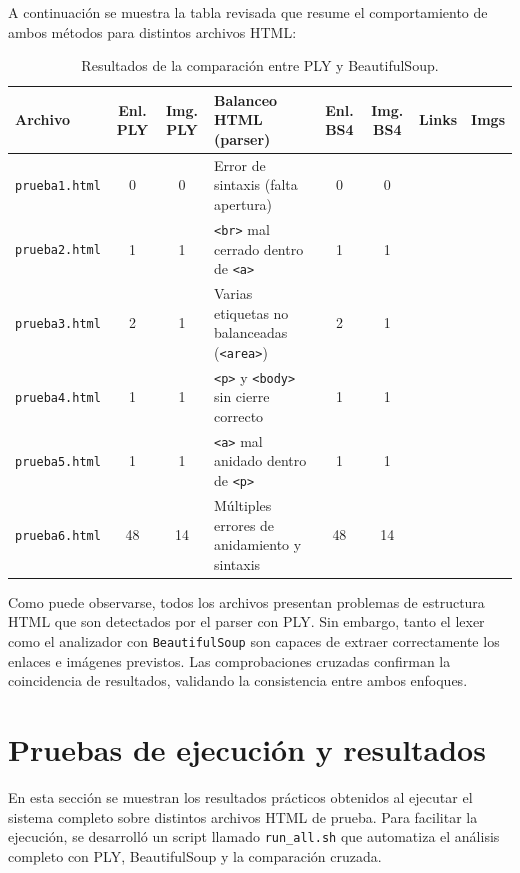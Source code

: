 \documentclass[11pt,a4paper]{article}
\newcommand{\cmark}{\ding{51}}
\begin{document}
A continuación se muestra la tabla revisada que resume el comportamiento de ambos métodos para distintos archivos HTML:

\begin{table}[H]
\renewcommand{\arraystretch}{1.3}
\small
\begin{tabularx}{\textwidth}{|l|c|c|>{\raggedright\arraybackslash}X|c|c|c|c|}
\hline
\textbf{Archivo} & \textbf{Enl. PLY} & \textbf{Img. PLY} & \textbf{Balanceo HTML (parser)} & \textbf{Enl. BS4} & \textbf{Img. BS4} & \textbf{Links} & \textbf{Imgs} \\
\hline
\texttt{prueba1.html} & 0 & 0 & Error de sintaxis (falta apertura) & 0 & 0 & \cmark & \cmark \\
\texttt{prueba2.html} & 1 & 1 & \texttt{<br>} mal cerrado dentro de \texttt{<a>} & 1 & 1 & \cmark & \cmark \\
\texttt{prueba3.html} & 2 & 1 & Varias etiquetas no balanceadas (\texttt{<area>}) & 2 & 1 & \cmark & \cmark \\
\texttt{prueba4.html} & 1 & 1 & \texttt{<p>} y \texttt{<body>} sin cierre correcto & 1 & 1 & \cmark & \cmark \\
\texttt{prueba5.html} & 1 & 1 & \texttt{<a>} mal anidado dentro de \texttt{<p>} & 1 & 1 & \cmark & \cmark \\
\texttt{prueba6.html} & 48 & 14 & Múltiples errores de anidamiento y sintaxis & 48 & 14 & \cmark & \cmark \\
\hline
\end{tabularx}
\caption*{Resultados de la comparación entre PLY y BeautifulSoup.}
\end{table}

\medskip

Como puede observarse, todos los archivos presentan problemas de estructura HTML que son detectados por el parser con PLY. Sin embargo, tanto el lexer como el analizador con \texttt{BeautifulSoup} son capaces de extraer correctamente los enlaces e imágenes previstos. Las comprobaciones cruzadas confirman la coincidencia de resultados, validando la consistencia entre ambos enfoques.

\section{Pruebas de ejecución y resultados}

En esta sección se muestran los resultados prácticos obtenidos al ejecutar el sistema completo sobre distintos archivos HTML de prueba. Para facilitar la ejecución, se desarrolló un script llamado \texttt{run\_all.sh} que automatiza el análisis completo con PLY, BeautifulSoup y la comparación cruzada.
\end{document}
